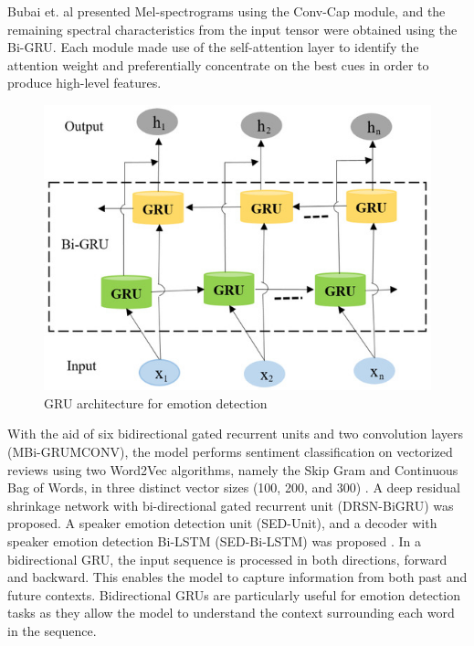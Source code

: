 \documentclass[conference]{IEEEtran}
\begin{document}
Bubai et. al \cite{electronics11091328} presented Mel-spectrograms  using the Conv-Cap module, and the remaining spectral characteristics from the input tensor were obtained using the Bi-GRU. Each module made use of the self-attention layer to identify the attention weight and preferentially concentrate on the best cues in order to produce high-level features. 
\begin{figure}
\centerline{\includegraphics[scale=0.5]{GRU.png}}
\caption{GRU architecture for emotion detection \cite{electronics11091328}}
\end{figure}
 With the aid of six bidirectional gated recurrent units and two convolution layers (MBi-GRUMCONV), the model performs sentiment classification on vectorized reviews using two Word2Vec algorithms, namely the Skip Gram and Continuous Bag of Words, in three distinct vector sizes (100, 200, and 300) \cite{bacsarslan2023mbi}. \cite{han2023speech} A deep residual shrinkage network with bi-directional gated recurrent unit (DRSN-BiGRU) was proposed. A speaker emotion detection unit (SED-Unit), and a decoder with speaker emotion detection Bi-LSTM (SED-Bi-LSTM) was proposed \cite{liang2023mmateric}. In a bidirectional GRU, the input sequence is processed in both directions, forward and backward. This enables the model to capture information from both past and future contexts. Bidirectional GRUs are particularly useful for emotion detection tasks as they allow the model to understand the context surrounding each word in the sequence.
\end{document}

